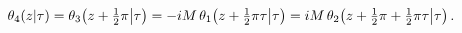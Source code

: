 \[\mathop{\theta_{4}\/}\nolimits\!\left(z\middle|\tau\right)=\mathop{\theta_{3}%
\/}\nolimits\!\left(z+\tfrac{1}{2}\pi\middle|\tau\right)=-iM\mathop{\theta_{1}%
\/}\nolimits\!\left(z+\tfrac{1}{2}\pi\tau\middle|\tau\right)=iM\mathop{\theta_%
{2}\/}\nolimits\!\left(z+\tfrac{1}{2}\pi+\tfrac{1}{2}\pi\tau\middle|\tau\right).\]